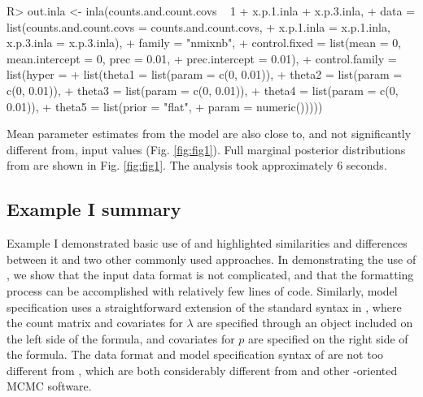 \documentclass[article]{jss}
\begin{document}
\begin{CodeInput}
R> out.inla <- inla(counts.and.count.covs ~ 1 + x.p.1.inla + x.p.3.inla,
+           data = list(counts.and.count.covs = counts.and.count.covs,
+                       x.p.1.inla = x.p.1.inla, x.p.3.inla = x.p.3.inla),
+           family = "nmixnb",
+           control.fixed = list(mean = 0, mean.intercept = 0, prec = 0.01,
+                                prec.intercept = 0.01),
+           control.family = list(hyper = 
+                                  list(theta1 = list(param = c(0, 0.01)),
+                                       theta2 = list(param = c(0, 0.01)),
+                                       theta3 = list(param = c(0, 0.01)),
+                                       theta4 = list(param = c(0, 0.01)),
+                                       theta5 = list(prior = "flat",
+                                                     param = numeric()))))
\end{CodeInput}

Mean parameter estimates from the  model are also close to, and not significantly different from, input values (Fig. \ref{fig:fig1}). Full marginal posterior distributions from  are shown in Fig. \ref{fig:fig1}. The analysis took approximately 6 seconds.

\subsection[Example I summary]{Example I summary}
Example I demonstrated basic use of  and highlighted similarities and differences between it and two other commonly used approaches. In demonstrating the use of , we show that the input data format is not complicated, and that the formatting process can be accomplished with relatively few lines of code. Similarly, model specification uses a straightforward extension of the standard syntax in , where the count matrix and covariates for $\lambda$ are specified through an  object included on the left side of the formula, and covariates for $p$ are specified on the right side of the formula. The data format and model specification syntax of  are not too different from , which are both considerably different from  and other -oriented MCMC software.
\end{document}
